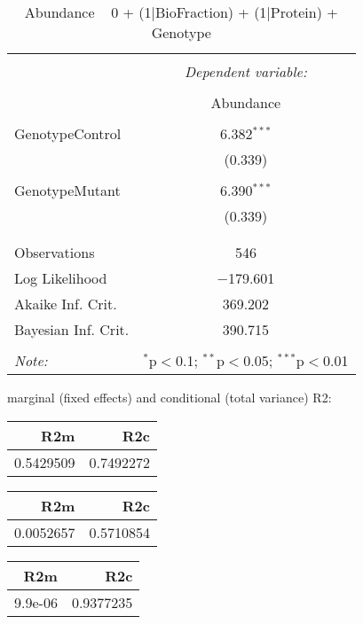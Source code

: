 \documentclass[11pt]{report}
\begin{document}
\begin{table}[!htbp] \centering 
  \caption{Abundance ~ 0 + (1|BioFraction) + (1|Protein) + Genotype} 
  \label{} 
\begin{tabular}{@{\extracolsep{5pt}}lc} 
\\[-1.8ex]\hline 
\hline \\[-1.8ex] 
 & \multicolumn{1}{c}{\textit{Dependent variable:}} \\ 
\cline{2-2} 
\\[-1.8ex] & Abundance \\ 
\hline \\[-1.8ex] 
 GenotypeControl & 6.382$^{***}$ \\ 
  & (0.339) \\ 
  & \\ 
 GenotypeMutant & 6.390$^{***}$ \\ 
  & (0.339) \\ 
  & \\ 
\hline \\[-1.8ex] 
Observations & 546 \\ 
Log Likelihood & $-$179.601 \\ 
Akaike Inf. Crit. & 369.202 \\ 
Bayesian Inf. Crit. & 390.715 \\ 
\hline 
\hline \\[-1.8ex] 
\textit{Note:}  & \multicolumn{1}{r}{$^{*}$p$<$0.1; $^{**}$p$<$0.05; $^{***}$p$<$0.01} \\ 
\end{tabular} 
\end{table} 
marginal (fixed effects) and conditional (total variance) R2:

\begin{tabular}{r|r}
\hline
R2m & R2c\\
\hline
0.5429509 & 0.7492272\\
\hline
\end{tabular}

\begin{tabular}{r|r}
\hline
R2m & R2c\\
\hline
0.0052657 & 0.5710854\\
\hline
\end{tabular}

\begin{tabular}{r|r}
\hline
R2m & R2c\\
\hline
9.9e-06 & 0.9377235\\
\hline
\end{tabular}
\end{document}
